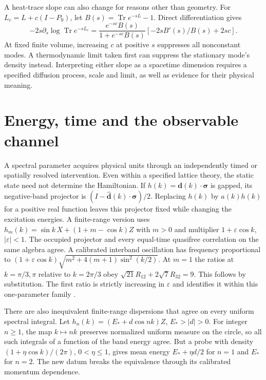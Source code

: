 \documentclass[11pt,letterpaper]{article}
\newcommand{\tr}{\operatorname{Tr}}\newcommand{\TV}{\operatorname{TV}}\newcommand{\E}{\mathbb E}\newcommand{\id}{\mathbb I}\newcommand{\calB}{\mathcal B}\newcommand{\norm}[1]{\left\lVert#1\right\rVert}
\begin{document}
A heat-trace slope can also change for reasons other than geometry. For $L_c=L+c(I-P_0)$, let $B(s)=\tr e^{-sL}-1$. Direct differentiation gives
\[
 -2s\partial_s\log\tr e^{-s L_c}
 = \frac{e^{-sc}B(s)}{1+e^{-sc}B(s)}
       [-2sB'(s)/B(s)+2sc].
\]
At fixed finite volume, increasing $c$ at positive $s$ suppresses all nonconstant modes. A thermodynamic limit taken first can suppress the stationary mode's density instead. Interpreting either slope as a spacetime dimension requires a specified diffusion process, scale and limit, as well as evidence for their physical meaning.

\section{Energy, time and the observable channel}\label{sec:energy}

A spectral parameter acquires physical units through an independently timed or spatially resolved intervention. Even within a specified lattice theory, the static state need not determine the Hamiltonian. If $h(k)=\boldsymbol d(k)\cdot\boldsymbol\sigma$ is gapped, its negative-band projector is $(I-\widehat{\boldsymbol d}(k)\cdot\boldsymbol\sigma)/2$. Replacing $h(k)$ by $a(k)h(k)$ for a positive real function leaves this projector fixed while changing the excitation energies. A finite-range version uses $h_m(k)=\sin k\,X+(1+m-\cos k)Z$ with $m>0$ and multiplier $1+\varepsilon\cos k$, $|\varepsilon|<1$. The occupied projector and every equal-time quasifree correlation on the same algebra agree. A calibrated interband oscillation has frequency proportional to $(1+\varepsilon\cos k)\sqrt{m^2+4(m+1)\sin^2(k/2)}$. At $m=1$ the ratios at $k=\pi/3,\pi$ relative to $k=2\pi/3$ obey $\sqrt{21}R_{12}+2\sqrt7 R_{32}=9$. This follows by substitution. The first ratio is strictly increasing in $\varepsilon$ and identifies it within this one-parameter family \cite{projector}.

There are also inequivalent finite-range dispersions that agree on every uniform spectral integral. Let $h_n(k)=(E_*+d\cos nk)Z$, $E_*>|d|>0$. For integer $n\ge1$, the map $k\mapsto nk$ preserves normalized uniform measure on the circle, so all such integrals of a function of the band energy agree. But a probe with density $(1+\eta\cos k)/(2\pi)$, $0<\eta\le1$, gives mean energy $E_*+\eta d/2$ for $n=1$ and $E_*$ for $n=2$. The new datum breaks the equivalence through its calibrated momentum dependence.
\end{document}
